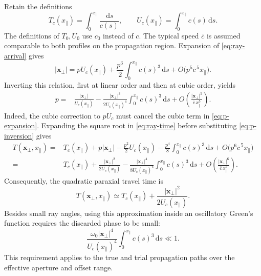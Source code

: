 \documentclass[11pt]{article}
\newcommand{\bx}{\bm{x}}
\newcommand{\dd}{\,\mathrm{d}}
\begin{document}
Retain the definitions
\begin{equation}
T_c(x_\parallel)=\int_0^{x_\parallel}\frac{\dd s}{c(s)},
\qquad
U_c(x_\parallel)=\int_0^{x_\parallel}c(s)\dd s.
\label{eq:TU}
\end{equation}
The definitions of $T_0,U_0$ use $c_0$ instead of $c$.
The typical speed $\overline c$ is assumed comparable to both profiles
on the propagation region. Expansion of \eqref{eq:ray-arrival} gives
\begin{equation}
|\bx_\perp|
=pU_c(x_\parallel)
+\frac{p^3}{2}\int_0^{x_\parallel}c(s)^3\dd s
+O\big(p^5\overline c^{\,5}x_\parallel\big).
\label{eq:p-expansion}
\end{equation}
Inverting this relation, first at linear order and then at cubic order,
yields
\begin{align}
p={}&\frac{|\bx_\perp|}{U_c(x_\parallel)}
-\frac{|\bx_\perp|^3}{2U_c(x_\parallel)^4}
\int_0^{x_\parallel}c(s)^3\dd s
+O\!\left(\frac{|\bx_\perp|^5}{\overline c\,x_\parallel^5}\right).
\label{eq:p-inversion}
\end{align}
Indeed, the cubic correction to $pU_c$ must cancel the cubic term in
\eqref{eq:p-expansion}. Expanding the square root in \eqref{eq:ray-time}
before substituting \eqref{eq:p-inversion} gives
\begin{align}
T(\bx_\perp,x_\parallel)
={}&T_c(x_\parallel)+p|\bx_\perp|
-\frac{p^2}{2}U_c(x_\parallel)
-\frac{p^4}{8}\int_0^{x_\parallel}c(s)^3\dd s
+O\big(p^6\overline c^{\,5}x_\parallel\big)\\
={}&T_c(x_\parallel)
+\frac{|\bx_\perp|^2}{2U_c(x_\parallel)}
-\frac{|\bx_\perp|^4}{8U_c(x_\parallel)^4}
\int_0^{x_\parallel}c(s)^3\dd s
+O\!\left(\frac{|\bx_\perp|^6}{\overline c\,x_\parallel^5}\right).
\label{eq:travel-fourth}
\end{align}
Consequently, the quadratic paraxial travel time is
\begin{equation}
T(\bx_\perp,x_\parallel)
\simeq T_c(x_\parallel)
+\frac{|\bx_\perp|^2}{2U_c(x_\parallel)}.
\label{eq:travel-paraxial}
\end{equation}
Besides small ray angles, using this approximation inside an oscillatory
Green's function requires the discarded phase to be small:
\begin{equation}
\frac{\omega_0|\bx_\perp|^4}{U_c(x_\parallel)^4}
\int_0^{x_\parallel}c(s)^3\dd s\ll1.
\label{eq:phase-remainder}
\end{equation}
This requirement applies to the true and trial propagation paths over the
effective aperture and offset range.
\end{document}
